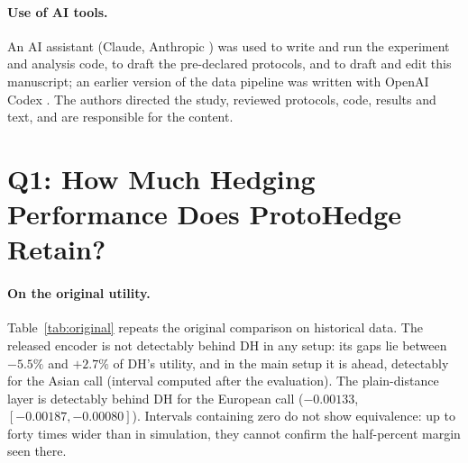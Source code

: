 \documentclass[runningheads]{llncs}
\begin{document}
\paragraph{Use of AI tools.} An AI assistant (Claude, Anthropic \cite{anthropicClaude2026}) was used to
write and run the experiment and analysis code, to draft the pre-declared protocols, and to draft and edit
this manuscript; an earlier version of the data pipeline was written with OpenAI Codex
\cite{openaiCodex2026}. The authors directed the study, reviewed protocols, code, results and text, and are
responsible for the content.

\section{Q1: How Much Hedging Performance Does ProtoHedge Retain?}
\label{sec:results}

\begin{table}[t]
\caption{The original paper's comparison. Gain over not hedging in the utility $U=\mathrm{CVaR}_{50}(O)$,
in units of $S_0$ (higher is better); PH minus DH with 95\% interval; $|U_{\mathrm{DH}}|$, DH's utility
level; Rel.\ = (PH $-$ DH)$/|U_{\mathrm{DH}}|$, the original paper's convention (the paper rows quote its
published values, which do not give $U_{\mathrm{DH}}$); spread removed. BS/SV: simulated Black--Scholes and stochastic-volatility markets; ``rerun'': authors' code and
default seeds. Equal tuning and Main: setups (ii) and (iii); encoder/plain: the two PH layers. Historical: test 2022--2024, tickers equal-weighted, seeds averaged. Intervals are secondary
contrasts without multiplicity adjustment; $^{\dagger}$computed after the main evaluation.}
\label{tab:original}
\centering
\scriptsize
\setlength{\tabcolsep}{0.9pt}

\end{table}

\paragraph{On the original utility.} Table~\ref{tab:original} repeats the original comparison on
historical data. The released encoder is not detectably behind DH in any setup: its gaps lie between
$-5.5\%$ and $+2.7\%$ of DH's utility, and in the main setup it is ahead, detectably for the Asian call
(interval computed after the evaluation). The plain-distance layer is detectably behind DH for the European
call ($-0.00133$, $[-0.00187,-0.00080]$). Intervals containing zero do not show equivalence: up to forty
times wider than in simulation, they cannot confirm the half-percent margin seen there.
\end{document}
